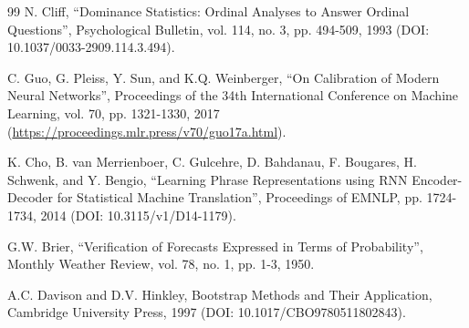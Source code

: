 \documentclass{jot}
\begin{document}
\begin{thebibliography}{99}
 N. Cliff, ``Dominance Statistics: Ordinal Analyses to Answer Ordinal Questions'', Psychological Bulletin, vol. 114, no. 3, pp. 494-509, 1993 (DOI: 10.1037/0033-2909.114.3.494).

 C. Guo, G. Pleiss, Y. Sun, and K.Q. Weinberger, ``On Calibration of Modern Neural Networks'', Proceedings of the 34th International Conference on Machine Learning, vol. 70, pp. 1321-1330, 2017 (\url{https://proceedings.mlr.press/v70/guo17a.html}).

 K. Cho, B. van Merrienboer, C. Gulcehre, D. Bahdanau, F. Bougares, H. Schwenk, and Y. Bengio, ``Learning Phrase Representations using RNN Encoder-Decoder for Statistical Machine Translation'', Proceedings of EMNLP, pp. 1724-1734, 2014 (DOI: 10.3115/v1/D14-1179).

 G.W. Brier, ``Verification of Forecasts Expressed in Terms of Probability'', Monthly Weather Review, vol. 78, no. 1, pp. 1-3, 1950.

 A.C. Davison and D.V. Hinkley, Bootstrap Methods and Their Application, Cambridge University Press, 1997 (DOI: 10.1017/CBO9780511802843).

\end{thebibliography}
\def\EndNotes{}
\end{document}
